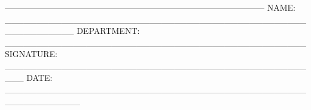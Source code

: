 \documentclass[../main.tex]{subfiles}
\begin{document}
 ---------------------------------------------------------------------------------------------
\newline NAME: \_\_\_\_\_\_\_\_\_\_\_\_\_\_\_\_\_\_\_\_\_\_\_\_\_\_\_\_\_\_\_\_\_\_\_\_\_\_\_\_\_\_\_\_\_\_\_\_\_\_\_\_\_\_\_\_\_\_\_
\newline DEPARTMENT: \_\_\_\_\_\_\_\_\_\_\_\_\_\_\_\_\_\_\_\_\_\_\_\_\_\_\_\_\_\_\_\_\_\_\_\_\_\_\_\_\_\_\_\_\_\_\_\_
\newline SIGNATURE: \_\_\_\_\_\_\_\_\_\_\_\_\_\_\_\_\_\_\_\_\_\_\_\_\_\_\_\_\_\_\_\_\_\_\_\_\_\_\_\_\_\_\_\_\_\_\_\_\_\_\_
\newline DATE: \_\_\_\_\_\_\_\_\_\_\_\_\_\_\_\_\_\_\_\_\_\_\_\_\_\_\_\_\_\_\_\_\_\_\_\_\_\_\_\_\_\_\_\_\_\_\_\_\_\_\_\_\_\_\_\_\_\_\_\_
\end{document}
